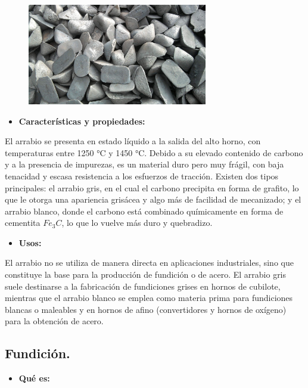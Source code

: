 \documentclass[12pt,a4paper]{article}
\begin{document}
\begin{figure}[H]    
    \centering         
    \includegraphics[width=0.7\textwidth]{Inagenes para latex/1 Arrabio.jpg}
\end{figure}
\begin{itemize}
    \item \textbf{Características y propiedades:}
\end{itemize}

El arrabio se presenta en estado líquido a la salida del alto horno, con temperaturas entre 1250 °C y 1450 °C. Debido a su elevado contenido de carbono y a la presencia de impurezas, es un material duro pero muy frágil, con baja tenacidad y escasa resistencia a los esfuerzos de tracción. Existen dos tipos principales: el arrabio gris, en el cual el carbono precipita en forma de grafito, lo que le otorga una apariencia grisácea y algo más de facilidad de mecanizado; y el arrabio blanco, donde el carbono está combinado químicamente en forma de cementita $Fe_3C$, lo que lo vuelve más duro y quebradizo.

\begin{itemize}
    \item \textbf{Usos:}
\end{itemize}

El arrabio no se utiliza de manera directa en aplicaciones industriales, sino que constituye la base para la producción de fundición o de acero. El arrabio gris suele destinarse a la fabricación de fundiciones grises en hornos de cubilote, mientras que el arrabio blanco se emplea como materia prima para fundiciones blancas o maleables y en hornos de afino (convertidores y hornos de oxígeno) para la obtención de acero.

\subsection{Fundición.}

\begin{itemize}
    \item \textbf{Qué es:}
\end{itemize}
\end{document}
